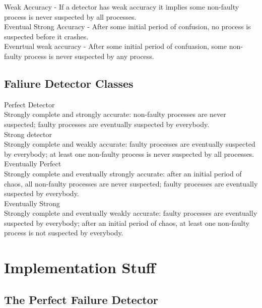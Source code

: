 \documentclass{article}
\begin{document}
\noindent
Weak Accuracy - If a detector has weak accuracy it implies some non-faulty process is never suspected by all processes.\\

\noindent
Eventual Strong Accuracy - After some initial period of confusion, no process is suspected before it crashes.\\

\noindent
Evenrtual weak accuracy - After some initial period of confuasion, some non-faulty process is never suspected by any process.

\subsection{Faliure Detector Classes}

\noindent
Perfect Detector\\
Strongly complete and strongly accurate: non-faulty processes are never suspected; faulty processes are eventually suspected by everybody.\\ 

\noindent    
Strong detector\\
Strongly complete and weakly accurate: faulty processes are eventually suspected by everybody; at least one non-faulty process is never suspected by all processes. \\

\noindent    
Eventually Perfect\\
Strongly complete and eventually strongly accurate: after an initial period of chaos, all non-faulty processes are never suspected; faulty processes are eventually suspected by everybody. \\
    
\noindent
Eventually Strong\\
Strongly complete and eventually weakly accurate: faulty processes are eventually suspected by everybody; after an initial period of chaos, at least one non-faulty process is not suspected by everybody.\\

\newpage

\section{Implementation Stuff}

\subsection{The Perfect Failure Detector}
\end{document}
